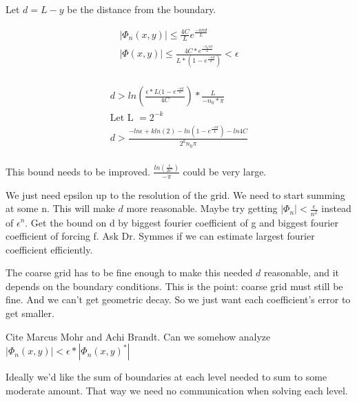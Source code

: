 \documentclass[12pt]{article}
\begin{document}
Let $d = L-y$ be the distance from the boundary. 

\begin{align*}
|\Phi_n(x, y)| \leq \frac{4C}{L} e^\frac{{-n \pi d}}{L} \\
|\Phi(x, y)| \leq \frac{4C * e^\frac{-n_0 \pi d}{L}}{L*(1 - e^\frac{-\pi d}{L})} < \epsilon\\
\end{align*}

\begin{align*}
d > ln(\frac{\epsilon * L(1 - e^\frac{-\pi d}{L}}{{4C}})*\frac{L}{-n_0 * \pi}\\
\text{Let L }= 2^{-k} \\
d > \frac{-ln\epsilon + kln(2) - ln(1 - e^\frac{-\pi d}{L}) - ln4C }{2^k n_0 \pi}\\
\end{align*}

This bound needs to be improved. $\frac{ln(\frac{\epsilon}{2C})}{-\pi}$ could be very large. 

We just need epsilon up to the resolution of the grid. We need to start summing at some n. This will make $d$ more reasonable. Maybe try getting $|\Phi_n| < \frac{\epsilon}{n^2}$ instead of $\epsilon^n$. Get the bound on d by biggest fourier coefficient of g and biggest fourier coefficient of forcing f. Ask Dr. Symmes if we can estimate largest fourier coefficient efficiently. 

The coarse grid has to be fine enough to make this needed $d$ reasonable, and it depends on the boundary conditions. This is the point: coarse grid must still be fine. And we can't get geometric decay. So we just want each coefficient's error to get smaller. 

Cite Marcus Mohr and Achi Brandt. Can we somehow analyze $|\Phi_n(x, y)| < \epsilon * |\Phi_n(x, y)^*|$

Ideally we'd like the sum of boundaries at each level needed to sum to some moderate amount. That way we need no communication when solving each level. 






\end{document}
